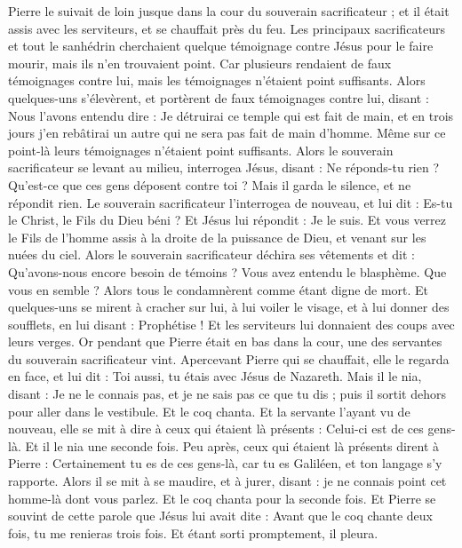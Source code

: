 \begin{multicols}{2}
Pierre le suivait de loin jusque dans la cour du souverain sacrificateur ; et il était assis avec les serviteurs, et se chauffait près du feu.
Les principaux sacrificateurs et tout le sanhédrin cherchaient quelque témoignage contre Jésus pour le faire mourir, mais ils n'en trouvaient point.
Car plusieurs rendaient de faux témoignages contre lui, mais les témoignages n’étaient point suffisants.
Alors quelques-uns s'élevèrent, et portèrent de faux témoignages contre lui, disant :
Nous l’avons entendu dire : Je détruirai ce temple qui est fait de main, et en trois jours j'en rebâtirai un autre qui ne sera pas fait de main d’homme.
Même sur ce point-là leurs témoignages n’étaient point suffisants.
Alors le souverain sacrificateur se levant au milieu, interrogea Jésus, disant : Ne réponds-tu rien ? Qu’est-ce que ces gens déposent contre toi ?
Mais il garda le silence, et ne répondit rien. Le souverain sacrificateur l'interrogea de nouveau, et lui dit : Es-tu le Christ, le Fils du Dieu béni ?
Et Jésus lui répondit : Je le suis. Et vous verrez le Fils de l'homme assis à la droite de la puissance de Dieu, et venant sur les nuées du ciel.
Alors le souverain sacrificateur déchira ses vêtements et dit : Qu'avons-nous encore besoin de témoins ?
Vous avez entendu le blasphème. Que vous en semble ? Alors tous le condamnèrent comme étant digne de mort.
Et quelques-uns se mirent à cracher sur lui, à lui voiler le visage, et à lui donner des soufflets, en lui disant : Prophétise ! Et les serviteurs lui donnaient des coups avec leurs verges.
Or pendant que Pierre était en bas dans la cour, une des servantes du souverain sacrificateur vint.
Apercevant Pierre qui se chauffait, elle le regarda en face, et lui dit : Toi aussi, tu étais avec Jésus de Nazareth.
Mais il le nia, disant : Je ne le connais pas, et je ne sais pas ce que tu dis ; puis il sortit dehors pour aller dans le vestibule. Et le coq chanta.
Et la servante l'ayant vu de nouveau, elle se mit à dire à ceux qui étaient là présents : Celui-ci est de ces gens-là. Et il le nia une seconde fois.
Peu après, ceux qui étaient là présents dirent à Pierre : Certainement tu es de ces gens-là, car tu es Galiléen, et ton langage s'y rapporte.
Alors il se mit à se maudire, et à jurer, disant : je ne connais point cet homme-là dont vous parlez.
Et le coq chanta pour la seconde fois. Et Pierre se souvint de cette parole que Jésus lui avait dite : Avant que le coq chante deux fois, tu me renieras trois fois. Et étant sorti promptement, il pleura.

\end{multicols}
